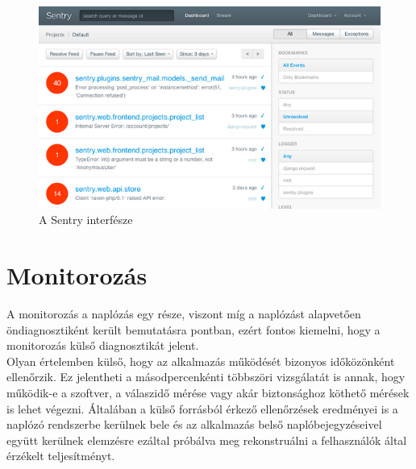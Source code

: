 \begin{figure}[ht]
	\centering
		\includegraphics[scale=1]{assets/sentry.png}%
		\caption[DUMMY]%
		{A Sentry interfésze}%
		\label{fig:sentry}
\end{figure}

\section{Monitorozás}
A monitorozás a naplózás egy része, viszont míg a naplózást alapvetően öndiagnosztiként került bemutatásra  pontban, ezért fontos kiemelni, hogy a monitorozás külső diagnosztikát jelent.\\
Olyan értelemben külső, hogy az alkalmazás működését bizonyos időközönként ellenőrzik. Ez jelentheti a másodpercenkénti többszöri vizsgálatát is annak, hogy működik-e a szoftver, a válaszidő mérése vagy akár biztonsághoz köthető mérések is lehet végezni. Általában a külső forrásból érkező ellenőrzések eredményei is a naplózó rendszerbe kerülnek bele és az alkalmazás belső naplóbejegyzéseivel együtt kerülnek elemzésre ezáltal próbálva meg rekonstruálni a felhasználók által érzékelt teljesítményt.

